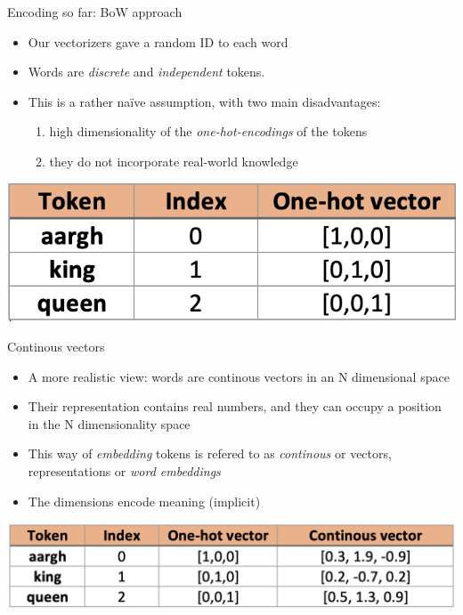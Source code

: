 \documentclass[compress]{beamer}
\begin{document}
\begin{frame}{Encoding so far: BoW approach}
	\begin{itemize}
		\item Our vectorizers gave a random ID to each word
		\item Words are \emph{discrete} and \emph{independent} tokens.
		\item This is a rather naïve assumption, with two main disadvantages:
\begin{enumerate}
	\item high dimensionality of the \emph{one-hot-encodings} of the tokens
	\item they do not incorporate real-world knowledge
\end{enumerate}
	\end{itemize}

\begin{center}
\includegraphics[scale=0.5]{bow.png}
\end{center}
\end{frame}

\begin{frame}{Continous vectors}
	\begin{itemize}
		\item A more realistic view: words are continous vectors in an N dimensional space
		\item Their representation contains real numbers, and they can occupy a position in the N dimensionality space
		\item This way of \emph{embedding} tokens is refered to as \emph{continous} or  vectors, representations or \emph{word embeddings}
		\item The dimensions encode meaning (implicit)
		\end{itemize}
\end{frame}

\begin{frame}
\begin{center}
	\includegraphics[scale=0.5]{bow_continous.png}
\end{center}
\end{frame}
\end{document}

